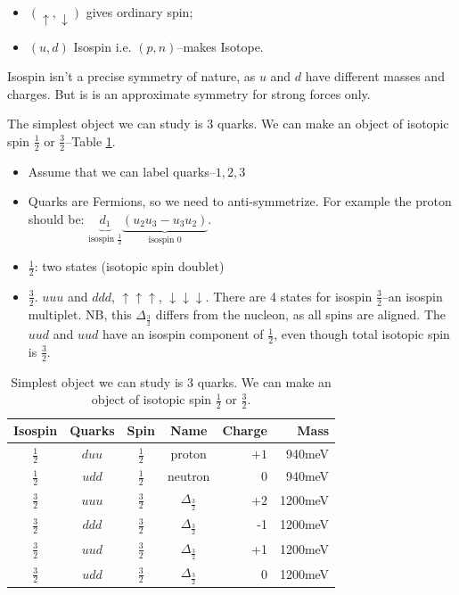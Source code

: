 \documentclass[]{article}
\begin{document}
\begin{itemize}
	\item $(\uparrow,\downarrow)$ gives ordinary spin;
	\item $(u,d)$ Isospin i.e.  $(p,n)$--makes Isotope.
\end{itemize}

Isospin isn't a precise symmetry of nature, as $u$ and $d$ have different masses and charges. But is is an approximate symmetry for strong forces only.

The simplest object we can study is 3 quarks. We can make an object of isotopic spin $\frac{1}{2}$ or $\frac{3}{2}$--Table \ref{table:3quark}.

\begin{itemize}
	\item Assume that we can label quarks--${1,2,3}$
	\item Quarks are Fermions, so we need to anti-symmetrize. For example the proton should be: $\underbrace{d_1}_\text{isospin $\frac{1}{2}$}\underbrace{(u_2u_3-u_3u_2)}_\text{isospin 0}$.
	\item $\frac{1}{2}$: two states (isotopic spin doublet)
	\item $\frac{3}{2}$. $uuu$ and $ddd$, $\uparrow\uparrow\uparrow$, $\downarrow\downarrow\downarrow$. There are 4 states for isospin $\frac{3}{2}$--an isospin multiplet. NB, this $\Delta_\frac{3}{2}$ differs from the nucleon, as all spins are aligned. The $uud$ and $uud$ have an isospin component of $\frac{1}{2}$, even though total isotopic spin is $\frac{3}{2}$.
\end{itemize}

\begin{table}[H]
	\begin{center}
		\caption[Simplest object we can study is 3 quarks.]{Simplest object we can study is 3 quarks. We can make an object of isotopic spin $\frac{1}{2}$ or $\frac{3}{2}$.}\label{table:3quark}
		\begin{tabular}{|c|c|c|c|r|r|}\hline
			Isospin&Quarks&Spin&Name&Charge&Mass\\ \hline
			$\frac{1}{2}$&$duu$&$\frac{1}{2}$&proton&$+1$&940meV\\ \hline
			$\frac{1}{2}$&$udd$&$\frac{1}{2}$&neutron&0&940meV\\ \hline
			$\frac{3}{2}$&$uuu$&$\frac{3}{2}$&$\Delta_\frac{3}{2}$&$+2$&1200meV\\ \hline
			$\frac{3}{2}$&$ddd$&$\frac{3}{2}$&$\Delta_\frac{3}{2}$&-1&1200meV\\ \hline
			$\frac{3}{2}$&$uud$&$\frac{3}{2}$&$\Delta_\frac{3}{2}$&+1&1200meV\\ \hline
			$\frac{3}{2}$&$udd$&$\frac{3}{2}$&$\Delta_\frac{3}{2}$&0&1200meV\\ \hline
		\end{tabular}
	\end{center}
\end{table}
\end{document}
